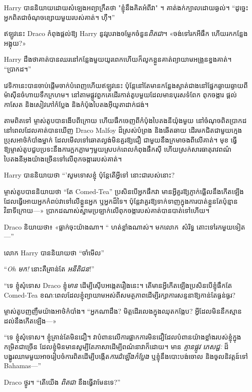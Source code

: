 Harry បាននិយាយដោយសំឡេងអព្យាក្រឹតថា "ខ្ញុំនឹងគិតអំពីវា" ។ គាត់ងក់ក្បាលដោយឆ្ងល់។ “ដូច្នេះ អ្នកពិតជាចំណុចខ្សោយមួយរបស់គាត់។ ហ៊ឺ។”

ឥឡូវនេះ Draco កំពុងផ្តល់ឱ្យ Harry នូវរូបរាងចម្លែកចំនួន\emph{ពិតជា}។ «ចង់ទៅរកអីផឹក ហើយរកកន្លែងអង្គុយ?»

Harry ដឹង​ថា​គាត់​បាន​ឈរ​នៅ​កន្លែង​មួយ​យូរ​ពេក​ហើយ​ក៏​លូក​ខ្លួន​គាត់​ព្យាយាម​អង្រួន​ខ្នង​គាត់។ “ប្រាកដ។”

វេទិកានេះបានចាប់ផ្តើមចាក់បំពេញហើយឥឡូវនេះ ប៉ុន្តែនៅតែមានកន្លែងស្ងាត់ជាងនៅផ្នែកឆ្ងាយឆ្ងាយពីម៉ាស៊ីនចំហាយទឹកក្រហម។ នៅតាមផ្លូវពួកគេដើរកាត់តូបមួយដែលមានបុរសទំពែក ពុកចង្ការ ផ្តល់កាសែត និងសៀវភៅកំប្លែង និងកំប៉ុងបៃតងអ៊ីយូតាដាក់ជង់។

តាមពិតទៅ ម្ចាស់តូបបានងើបពីក្រោយ ហើយផឹកចេញពីកំប៉ុងបៃតងនីយ៉ុងមួយ នៅចំណុចពិតប្រាកដ នៅពេលដែលគាត់បានឃើញ Draco Malfoy ដ៏ស្រស់បំព្រង និងឆើតឆាយ ដើរមកជិតជាមួយក្មេងប្រុសអាថ៌កំបាំងម្នាក់ ដែលមើលទៅឆោតល្ងង់មិនគួរឱ្យជឿ ជាមួយនឹងក្រមាចងពីលើគាត់។ មុខ ធ្វើឱ្យម្ចាស់តូបជួបប្រទះនឹងការក្អកភ្លាមៗមួយស្របក់ពេលកំពុងផឹកស៊ី ហើយស្រក់សារធាតុរាវពណ៌បៃតងនីអុងយ៉ាងច្រើនទៅលើពុកចង្ការរបស់គាត់។

Harry បាននិយាយថា “'សូមទោសខ្ញុំ ប៉ុន្តែតើអ្វីទៅ \emph{} នោះជារបស់នោះ?

ម្ចាស់តូបបាននិយាយថា “តែ Comed-Tea” ប្រសិនបើអ្នកផឹកវា មានអ្វីគួរឱ្យភ្ញាក់ផ្អើលនឹងកើតឡើង ដែលធ្វើអោយអ្នកកំពប់វាទៅលើខ្លួនអ្នក ឬអ្នកដ៏ទៃ។ ប៉ុន្តែ​វា​គួរ​ឱ្យ​ទាក់ទាញ​ក្នុង​ការ​បាត់​ខ្លួន​តែ​ប៉ុន្មាន​វិនាទី​ក្រោយ—» ប្រាកដ​ណាស់​ស្នាម​ប្រឡាក់​លើ​ពុក​ចង្កា​របស់​គាត់​បាន​បាត់​ទៅ​ហើយ។

Draco និយាយ​ថា​៖ ​«​ធ្លាក់​ចុះ​យ៉ាង​ណា។ “ ហត់ខ្លាំងណាស់។ មកលោក~សំរិទ្ធ តោះទៅរកមួយទៀត—”

លោក Harry បាននិយាយថា “ចាំមើល”

“\emph{Oh មក!} នោះ​គឺ​គ្រាន់​តែ \emph{អនីតិជន}!”

“ទេ ខ្ញុំសុំទោស Draco ខ្ញុំ\emph{មាន} ដើម្បីស៊ើបអង្កេតរឿងនេះ។ តើមានអ្វីកើតឡើងប្រសិនបើខ្ញុំផឹកតែ Comed-Tea ខណៈពេលដែលខ្ញុំព្យាយាមអស់ពីសមត្ថភាពដើម្បីរក្សាការសន្ទនាឱ្យកាន់តែធ្ងន់ធ្ងរ?

ម្ចាស់តូបញញឹមយ៉ាងអាថ៌កំបាំង។ “អ្នកណាដឹង? មិត្ត​ដើរ​លេង​ក្នុង​ឈុត​កង្កែប? អ្វី​ដែល​មិន​នឹក​ស្មាន​ដល់​នឹង​កើត​ឡើង—»

“ទេ ខ្ញុំសុំទោស។ ខ្ញុំគ្រាន់តែមិនជឿ។ វាបំពានលើការផ្អាកការមិនជឿដែលបំពានយ៉ាងខ្លាំងរបស់ខ្ញុំក្នុងកម្រិតជាច្រើន ដែលខ្ញុំមិនមានសូម្បីតែភាសាដើម្បីពណ៌នាវាក៏ដោយ។ មាន \emph{គ្មានផ្លូវ} \emph{ភេសជ្ជៈ} ដ៏បង្ហូរឈាមមួយអាចរៀបចំការពិតដើម្បីបង្កើត\emph{ការដំឡើងកំប្លែង} ឬខ្ញុំនឹងបោះបង់ចោល និងចូលនិវត្តន៍ទៅ Bahamas—”

Draco ថ្ងូរ។ “តើយើង \emph{ពិតជា} នឹងធ្វើវាមែនទេ?”

